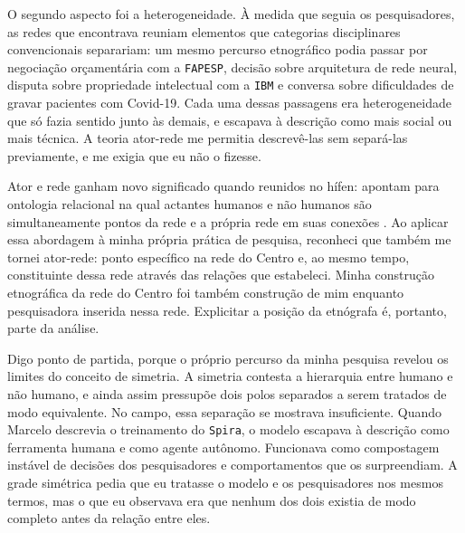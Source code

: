 O segundo aspecto foi a heterogeneidade. À medida que seguia os pesquisadores, as redes que encontrava reuniam elementos que categorias disciplinares convencionais separariam: um mesmo percurso etnográfico podia passar por negociação orçamentária com a \texttt{FAPESP}, decisão sobre arquitetura de rede neural, disputa sobre propriedade intelectual com a \texttt{IBM} e conversa sobre dificuldades de gravar pacientes com Covid-19. Cada uma dessas passagens era heterogeneidade que só fazia sentido junto às demais, e escapava à descrição como mais social ou mais técnica. A teoria ator-rede me permitia descrevê-las sem separá-las previamente, e me exigia que eu não o fizesse.

Ator e rede ganham novo significado quando reunidos no hífen: apontam para ontologia relacional na qual actantes humanos e não humanos são simultaneamente pontos da rede e a própria rede em suas conexões \parencite{latour1996clarifications}. Ao aplicar essa abordagem à minha própria prática de pesquisa, reconheci que também me tornei ator-rede: ponto específico na rede do Centro e, ao mesmo tempo, constituinte dessa rede através das relações que estabeleci. Minha construção etnográfica da rede do Centro foi também construção de mim enquanto pesquisadora inserida nessa rede. Explicitar a posição da etnógrafa é, portanto, parte da análise.

Digo ponto de partida, porque o próprio percurso da minha pesquisa revelou os limites do conceito de simetria. A simetria contesta a hierarquia entre humano e não humano, e ainda assim pressupõe dois polos separados a serem tratados de modo equivalente. No campo, essa separação se mostrava insuficiente. Quando Marcelo descrevia o treinamento do \texttt{Spira}, o modelo escapava à descrição como ferramenta humana e como agente autônomo. Funcionava como compostagem instável de decisões dos pesquisadores e comportamentos que os surpreendiam. A grade simétrica pedia que eu tratasse o modelo e os pesquisadores nos mesmos termos, mas o que eu observava era que nenhum dos dois existia de modo completo antes da relação entre eles.

